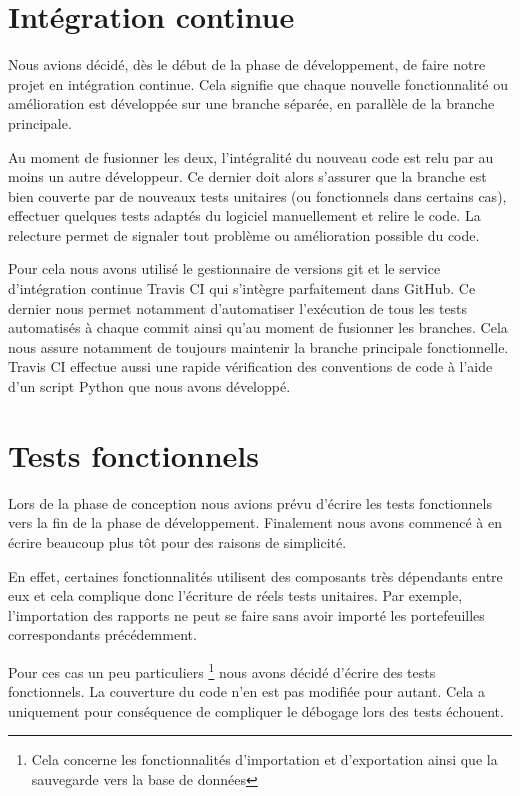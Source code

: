 \documentclass[a4paper,titlepage,french]{report}
\begin{document}
\section{Intégration continue}

Nous avions décidé, dès le début de la phase de développement, de faire notre projet en intégration continue.
Cela signifie que chaque nouvelle fonctionnalité ou amélioration est développée sur une branche séparée, en parallèle de la branche principale.

Au moment de fusionner les deux, l'intégralité du nouveau code est relu par au moins un autre développeur.
Ce dernier doit alors s'assurer que la branche est bien couverte par de nouveaux tests unitaires (ou fonctionnels dans certains cas), effectuer quelques tests adaptés du logiciel manuellement et relire le code.
La relecture permet de signaler tout problème ou amélioration possible du code.

Pour cela nous avons utilisé le gestionnaire de versions git et le service d'intégration continue Travis CI qui s'intègre parfaitement dans GitHub.
Ce dernier nous permet notamment d'automatiser l'exécution de tous les tests automatisés à chaque commit ainsi qu'au moment de fusionner les branches.
Cela nous assure notamment de toujours maintenir la branche principale fonctionnelle.
Travis CI effectue aussi une rapide vérification des conventions de code à l'aide d'un script Python que nous avons développé.


\section{Tests fonctionnels}

Lors de la phase de conception nous avions prévu d'écrire les tests fonctionnels vers la fin de la phase de développement.
Finalement nous avons commencé à en écrire beaucoup plus tôt pour des raisons de simplicité.

En effet, certaines fonctionnalités utilisent des composants très dépendants entre eux et cela complique donc l'écriture de réels tests unitaires.
Par exemple, l'importation des rapports ne peut se faire sans avoir importé les portefeuilles correspondants précédemment.

Pour ces cas un peu particuliers \footnote{Cela concerne les fonctionnalités d'importation et d'exportation ainsi que la sauvegarde vers la base de données} nous avons décidé d'écrire des tests fonctionnels.
La couverture du code n'en est pas modifiée pour autant.
Cela a uniquement pour conséquence de compliquer le débogage lors des tests échouent.
\end{document}
